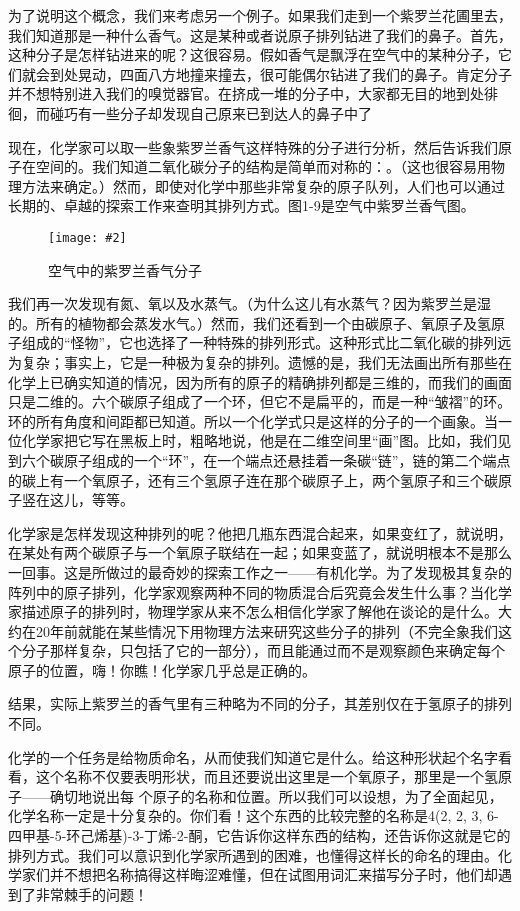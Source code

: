 \documentclass[12pt,oneside]{book}
\newenvironment{fig}[2][1]
{\begin{figure}[H]
\centering
\texttt{[image: \#2]}}
{\end{figure}}
\begin{document}
为了说明这个概念，我们来考虑另一个例子。如果我们走到一个紫罗兰花圃里去，我们知道那是一种什么香气。这是某种或者说原子排列钻进了我们的鼻子。首先，这种分子是怎样钻进来的呢？这很容易。假如香气是飘浮在空气中的某种分子，它们就会到处晃动，四面八方地撞来撞去，很可能偶尔钻进了我们的鼻子。肯定分子并不想特别进入我们的嗅觉器官。在挤成一堆的分子中，大家都无目的地到处徘徊，而碰巧有一些分子却发现自己原来已到达人的鼻子中了

现在，化学家可以取一些象紫罗兰香气这样特殊的分子进行分析，然后告诉我们原子在空间的。我们知道二氧化碳分子的结构是简单而对称的：。（这也很容易用物理方法来确定。）然而，即使对化学中那些非常复杂的原子队列，人们也可以通过长期的、卓越的探索工作来查明其排列方式。图1-9是空气中紫罗兰香气图。
\begin{fig}{空气中的紫罗兰香气分子}
\caption{空气中的紫罗兰香气分子}
\label{fig:空气中的紫罗兰香气分子}
\end{fig}
我们再一次发现有氮、氧以及水蒸气。（为什么这儿有水蒸气？因为紫罗兰是湿的。所有的植物都会蒸发水气。）然而，我们还看到一个由碳原子、氧原子及氢原子组成的“怪物”，它也选择了一种特殊的排列形式。这种形式比二氧化碳的排列远为复杂；事实上，它是一种极为复杂的排列。遗憾的是，我们无法画出所有那些在化学上已确实知道的情况，因为所有的原子的精确排列都是三维的，而我们的画面只是二维的。六个碳原子组成了一个环，但它不是扁平的，而是一种“皱褶”的环。环的所有角度和间距都已知道。所以一个化学式只是这样的分子的一个画象。当一位化学家把它写在黑板上时，粗略地说，他是在二维空间里“画”图。比如，我们见到六个碳原子组成的一个“环”，在一个端点还悬挂着一条碳“链”，链的第二个端点的碳上有一个氧原子，还有三个氢原子连在那个碳原子上，两个氢原子和三个碳原子竖在这儿，等等。

化学家是怎样发现这种排列的呢？他把几瓶东西混合起来，如果变红了，就说明，在某处有两个碳原子与一个氧原子联结在一起；如果变蓝了，就说明根本不是那么一回事。这是所做过的最奇妙的探索工作之一——有机化学。为了发现极其复杂的阵列中的原子排列，化学家观察两种不同的物质混合后究竟会发生什么事？当化学家描述原子的排列时，物理学家从来不怎么相信化学家了解他在谈论的是什么。大约在20年前就能在某些情况下用物理方法来研究这些分子的排列（不完全象我们这个分子那样复杂，只包括了它的一部分），而且能通过而不是观察颜色来确定每个原子的位置，嗨！你瞧！化学家几乎总是正确的。

结果，实际上紫罗兰的香气里有三种略为不同的分子，其差别仅在于氢原子的排列不同。

化学的一个任务是给物质命名，从而使我们知道它是什么。给这种形状起个名字看看，这个名称不仅要表明形状，而且还要说出这里是一个氧原子，那里是一个氢原子——确切地说出每 个原子的名称和位置。所以我们可以设想，为了全面起见，化学名称一定是十分复杂的。你们看！这个东西的比较完整的名称是4(2, 2, 3, 6-四甲基-5-环己烯基)-3-丁烯-2-酮，它告诉你这样东西的结构，还告诉你这就是它的排列方式。我们可以意识到化学家所遇到的困难，也懂得这样长的命名的理由。化学家们并不想把名称搞得这样晦涩难懂，但在试图用词汇来描写分子时，他们却遇到了非常棘手的问题！
\end{document}
